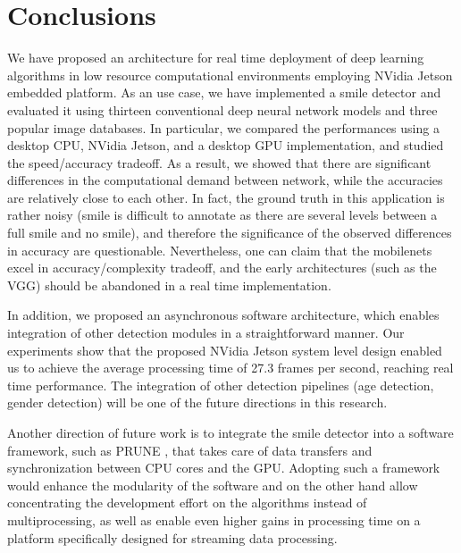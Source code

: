\documentclass[conference]{IEEEtran}
\begin{document}



\section{Conclusions}


We have proposed an architecture for real time deployment of deep learning algorithms in low resource computational environments employing NVidia Jetson embedded platform. As an use case, we have implemented a smile detector and evaluated it using thirteen conventional deep neural network models and three popular image databases. 
In particular, we compared the performances using a desktop CPU, NVidia Jetson, and a desktop GPU implementation, and studied the speed/accuracy tradeoff. As a result, we showed that there are significant differences in the computational demand between network, while the accuracies are relatively close to each other. In fact, the ground truth in this application is rather noisy (smile is difficult to annotate as there are several levels between a full smile and no smile), and therefore the significance of the observed differences in accuracy are questionable. Nevertheless, one can claim that the mobilenets excel in accuracy/complexity tradeoff, and the early architectures (such as the VGG) should be abandoned in a real time implementation.

In addition, we proposed an asynchronous software architecture, which enables integration of other detection modules in a straightforward manner. Our experiments show that the proposed NVidia Jetson system level design enabled us to achieve the average processing time of 27.3 frames per second, reaching real time performance. The integration of other detection pipelines (age detection, gender detection) will be one of the future directions in this research.

Another direction of future work is to integrate the smile detector into a software framework, such as PRUNE \cite{prune}, that takes care of data transfers and synchronization between CPU cores and the GPU. Adopting such a framework would enhance the modularity of the software and on the other hand allow concentrating the development effort on the algorithms instead of multiprocessing, as well as enable even higher gains in processing time on a platform specifically designed for streaming data processing.

\begin{table}
 \centering
{}\label{tab:comparison}
\begin{minipage}{0.4\textwidth}
\end{minipage}
\end{table}
\end{document}
